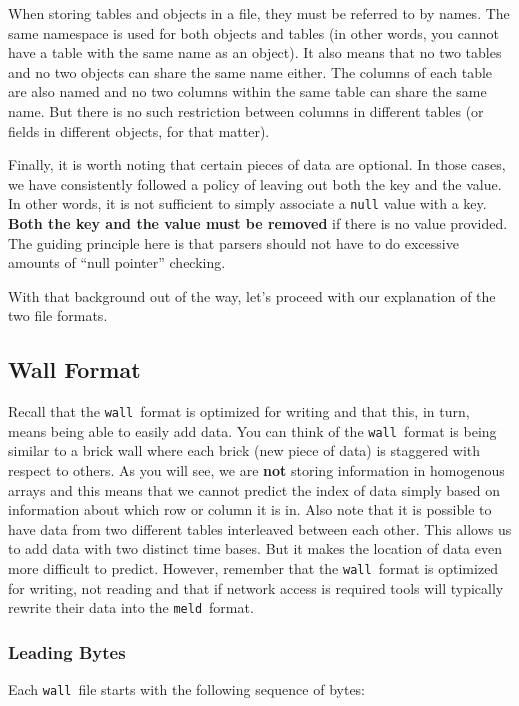 \documentclass[11pt,a4paper,twocolumn]{article}
\newcommand{\wall}{\texttt{wall}}
\newcommand{\meld}{\texttt{meld}}
\newcommand{\code}[1]{\texttt{#1}} %
\begin{document}
When storing tables and objects in a file, they must be referred to by
names.  The same namespace is used for both objects and tables (in
other words, you cannot have a table with the same name as an
object).  It also means that no two tables and no two objects can
share the same name either.  The columns of each table are also named
and no two columns within the same table can share the same name.  But
there is no such restriction between columns in different tables (or
fields in different objects, for that matter).

Finally, it is worth noting that certain pieces of data are optional.
In those cases, we have consistently followed a policy of leaving out
both the key and the value.  In other words, it is not sufficient to
simply associate a \code{null} value with a key.  \textbf{Both the key
and the value must be removed} if there is no value provided.  The
guiding principle here is that parsers should not have to do excessive
amounts of ``null pointer'' checking.

With that background out of the way, let's proceed with our
explanation of the two file formats.

\subsection{Wall Format}
\label{sec:wall_spec}

Recall that the \wall\ format is optimized for writing and that this,
in turn, means being able to easily add data.  You can think of the
\wall\ format is being similar to a brick wall where each brick (new
piece of data) is staggered with respect to others.  As you will see,
we are \textbf{not} storing information in homogenous arrays and this
means that we cannot predict the index of data simply based on
information about which row or column it is in.  Also note that it is
possible to have data from two different tables interleaved between
each other.  This allows us to add data with two distinct time bases.
But it makes the location of data even more difficult to predict.
However, remember that the \wall\ format is optimized for writing, not
reading and that if network access is required tools will typically
rewrite their data into the \meld\ format.

\subsubsection{Leading Bytes}

Each \wall\ file starts with the following sequence of bytes:
\end{document}
